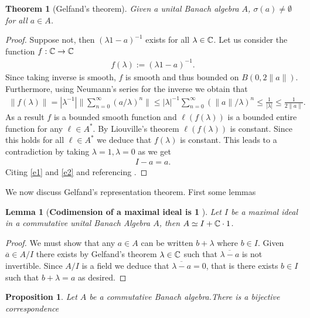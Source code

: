\documentclass[12pt]{article}
\newtheorem{theorem}{Theorem}
\newtheorem{proposition}{Proposition}
\newtheorem{lemma}{Lemma}
\renewcommand{\norm}[1]{\lVert #1 \rVert}\renewcommand{\abs}[1]{\left| #1 \right|}
\begin{document}
\begin{CJK*}{UTF8}{gbsn}
	\begin{theorem}[Gelfand's theorem]
		Given a unital Banach algebra $A$,  $\sigma (a)\neq \emptyset $ for all $a\in A$.
	\end{theorem}
	\begin{proof}
		Suppose not, then $(\lambda 1-a)^{-1}$ exists for all $\lambda \in  \mathbb{C}$. Let us consider the function $f:\mathbb{C} \to \mathbb{C}$
		\begin{align}\label{e1}
			f(\lambda):= (\lambda 1-a)^{-1}.
		\end{align}
		Since taking inverse is smooth, $f$ is smooth and thus bounded on $B(0,2\norm{a})$. Furthermore, using Neumann's series for the inverse  we obtain that
		\begin{align*}
			\norm{f(\lambda )} = \abs{\lambda^{-1}} \norm{\sum_{n=0}^{\infty}  (a / \lambda)^n }\leq \abs{\lambda}^{-1} \sum_{n=0}^{\infty} (\norm{a} / \lambda)^n \leq \frac{1}{\abs{ \lambda }}\leq \frac{1}{2 \norm{a}}  .
		\end{align*}
		As a result $f$ is a bounded smooth function and $ \ell (f(\lambda ))$ is a bounded entire function for any $\ell \in A^*$. By Liouville's theorem  $ \ell (f(\lambda ))$  is constant. Since this holds for all $\ell \in  A^*$ we deduce that $f(\lambda )$ is constant. This leads to a contradiction by taking $\lambda =1, \lambda =0$ as we get
		\begin{align}\label{e2}
			I -a= a   .
		\end{align}
		Citing \eqref{e1} and \eqref{e2} and referencing \cite{murphy2014c}.
	\end{proof}
	We now discuss Gelfand's representation theorem. First some lemmas
	\begin{lemma}[\textbf{Codimension of a maximal ideal is 1} ] Let $I$ be a maximal ideal in a commutative unital Banach Algebra  $A$, then  $A \simeq I+ \mathbb{C} \cdot 1$.
	\end{lemma}
	\begin{proof}
		We must show that any $a \in A$ can be written $b+\lambda $ where $b\in I$. Given $\overline{a} \in A/I$ there exists by Gelfand's theorem $\lambda  \in  \mathbb{C}$ such that $\overline{\lambda -a}$ is not invertible. Since $A /I$ is a field we deduce that $\overline{\lambda -a}=0$, that is there exists $ b \in  I$ such that $b+ \lambda =a$ as desired.
	\end{proof}

	\begin{proposition}
		Let $A$ be a commutative Banach algebra.There is a bijective correspondence


\end{proposition}
\end{CJK*}
\end{document}
